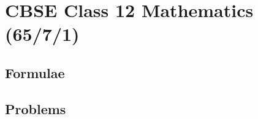 \documentclass[journal]{IEEEtran}
\begin{document}
\newpage


\tableofcontents

\newpage
\onecolumn


\renewcommand{\thetable}{\theenumi}

\section{CBSE Class 12 Mathematics (65/7/1)}
\subsection{Formulae}

\subsection{Problems}

\end{document}
